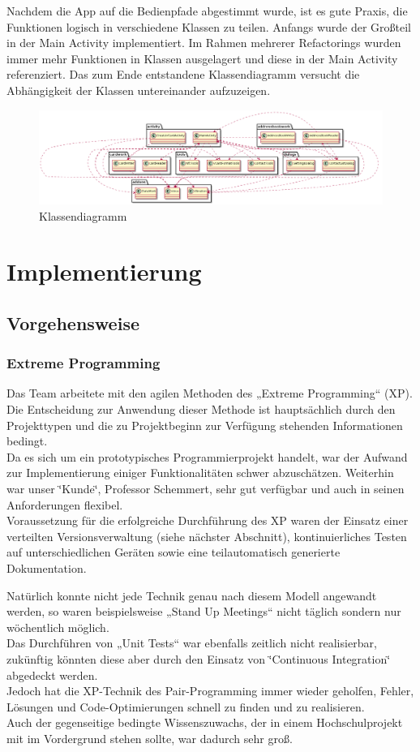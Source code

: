 \documentclass[a4paper,ngerman,12pt]{scrreprt}
\begin{document}
Nachdem die App auf die Bedienpfade abgestimmt wurde, ist es gute Praxis, die Funktionen logisch in verschiedene Klassen zu teilen. Anfangs wurde der Großteil in der Main Activity implementiert. Im Rahmen mehrerer Refactorings wurden immer mehr Funktionen in Klassen ausgelagert und diese in der Main Activity referenziert. Das zum Ende entstandene Klassendiagramm versucht die Abhängigkeit der Klassen untereinander aufzuzeigen.

 
\begin{figure}
\includegraphics[width=\textwidth]{general_class.png}
\caption{Klassendiagramm}
\end{figure}

\chapter{Implementierung}
\section{Vorgehensweise}
\subsection{Extreme Programming}

Das Team arbeitete mit den agilen Methoden des „Extreme Programming“ (XP). Die Entscheidung zur Anwendung dieser Methode ist hauptsächlich durch den Projekttypen und die zu Projektbeginn zur Verfügung stehenden Informationen bedingt. \\
Da es sich um ein prototypisches Programmierprojekt handelt, war der Aufwand zur Implementierung einiger Funktionalitäten schwer abzuschätzen. Weiterhin war unser \char`\"{}Kunde\char`\"{}, Professor Schemmert, sehr gut verfügbar und auch in seinen Anforderungen flexibel.\\ Voraussetzung für die erfolgreiche Durchführung des XP waren der Einsatz einer verteilten Versionsverwaltung (siehe nächster Abschnitt), kontinuierliches Testen auf unterschiedlichen Geräten sowie eine teilautomatisch generierte Dokumentation.

Natürlich konnte nicht jede Technik genau nach diesem Modell angewandt werden, so waren beispielsweise „Stand Up Meetings“ nicht täglich sondern nur wöchentlich möglich.\\ 
Das Durchführen von „Unit Tests“ war ebenfalls zeitlich nicht realisierbar, zukünftig könnten diese aber durch den Einsatz von \char`\"{}\ac{Continuous Integration}\char`\"{} abgedeckt werden. \\
Jedoch hat die XP-Technik des Pair-Programming immer wieder geholfen, Fehler, Lösungen und Code-Optimierungen schnell zu finden und zu realisieren. \\
Auch der gegenseitige bedingte Wissenszuwachs, der in einem Hochschulprojekt mit im Vordergrund stehen sollte, war dadurch sehr groß.
\end{document}
